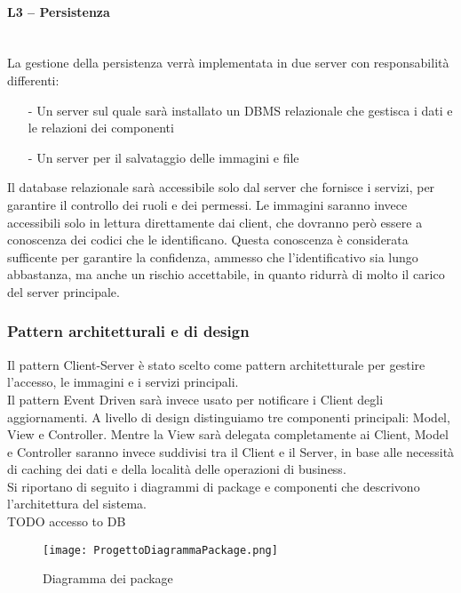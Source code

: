 \paragraph{L3 -- Persistenza}\mbox{}\\
La gestione della persistenza verrà implementata in due server con responsabilità differenti:
\begin{itemize}
    \item[-] Un server sul quale sarà installato un DBMS relazionale che gestisca i dati e le relazioni dei componenti
    \item[-] Un server per il salvataggio delle immagini e file
\end{itemize}

Il database relazionale sarà accessibile solo dal server che fornisce i servizi, per garantire il controllo dei ruoli e dei permessi.
Le immagini saranno invece accessibili solo in lettura direttamente dai client, che dovranno però essere a conoscenza dei codici che le identificano.
Questa conoscenza è considerata sufficente per garantire la confidenza, ammesso che l'identificativo sia lungo abbastanza,
ma anche un rischio accettabile, in quanto ridurrà di molto il carico del server principale.

\subsubsection{Pattern architetturali e di design}

Il pattern Client-Server è stato scelto come pattern architetturale per gestire l'accesso, le immagini e i servizi principali.\\
Il pattern Event Driven sarà invece usato per notificare i Client degli aggiornamenti.
A livello di design distinguiamo tre componenti principali: Model, View e Controller.
Mentre la View sarà delegata completamente ai Client, Model e Controller saranno invece suddivisi tra il Client e il Server,
in base alle necessità di caching dei dati e della località delle operazioni di business.\\
Si riportano di seguito i diagrammi di package e componenti che descrivono l'architettura del sistema.\\
TODO accesso to DB

\newpage
\begin{figure}[h!]
    \begin{center}
        \texttt{[image: ProgettoDiagrammaPackage.png]}
        \caption{Diagramma dei package}
    \end{center}
\end{figure}

